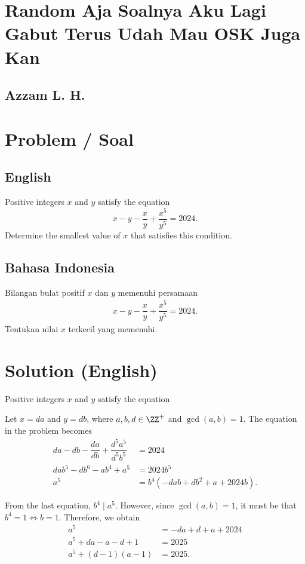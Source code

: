 \section*{Random Aja Soalnya Aku Lagi Gabut Terus Udah Mau OSK Juga Kan}
\subsection*{Azzam L. H.}

\section{Problem / Soal}
\subsection*{English}
Positive integers $x$ and $y$ satisfy the equation
$$
x - y - \dfrac{x}{y} + \dfrac{x^5}{y^5} = 2024.
$$
Determine the smallest value of \( x \) that satisfies this condition.


\subsection*{Bahasa Indonesia}
Bilangan bulat positif $x$ dan $y$ memenuhi persamaan
\begin{align*}
    x-y-\dfrac{x}{y}+\dfrac{x^5}{y^5}=2024.
\end{align*}
Tentukan nilai $x$ terkecil yang memenuhi.

\newpage
\renewcommand*\contentsname{Daftar Isi / Content}
\tableofcontents

\newpage
\section{Solution (English)}
Positive integers \( x \) and \( y \) satisfy the equation

Let \( x = da \) and \( y = db \), where \( a, b, d \in \ZZ^+ \) and \( \gcd(a, b) = 1 \). The equation in the problem becomes
\begin{align*}
    da - db - \dfrac{da}{db} + \dfrac{d^5a^5}{d^5b^5} &= 2024 \\
    dab^5 - db^6 - ab^4 + a^5 &= 2024b^5 \\
    a^5 &= b^4(-dab + db^2 + a + 2024b).
\end{align*}

From the last equation, \( b^4 \mid a^5 \). However, since \( \gcd(a, b) = 1 \), it must be that \( b^4 = 1 \iff b = 1 \). Therefore, we obtain
\begin{align*}
    a^5 &= -da + d + a + 2024 \\
    a^5 + da - a - d + 1 &= 2025 \\
    a^5 + (d-1)(a-1) &= 2025.
\end{align*}

